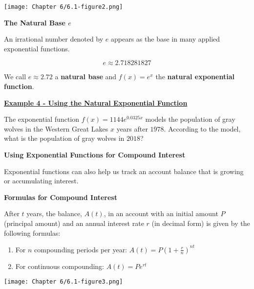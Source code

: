 \documentclass[12pt]{book}
\newcommand{\D}{\displaystyle}
\begin{document}
\newpage

\centerline{\texttt{[image: Chapter 6/6.1-figure2.png]}}

\vspace{30mm}



{\large \textbf{The Natural Base $e$}}

An irrational number denoted by $e$ appears as the base in many applied exponential functions.

$$e \approx 2.718281827$$

We call $e\approx 2.72$ a \textbf{natural base} and $f(x)=e^x$ the \textbf{natural exponential function}.

\vspace{30mm}
\underline{\textbf{Example 4 - Using the Natural Exponential Function}}

The exponential function $f(x)=1144e^{0.0325x}$ models the population of gray wolves in the Western Great Lakes $x$ years after $1978$. According to the model, what is the population of gray wolves in $2018$?
\newpage

{\large \textbf{Using Exponential Functions for Compound Interest}}

Exponential functions can also help us track an account balance that is growing or accumulating interest.

\begin{boxR}
    \textbf{Formulas for Compound Interest}
    \vspace{1mm}
    \hline
    \vspace{2mm}

    After $t$ years, the balance, $A(t)$, in an account with an initial amount $P$ (principal amount) and an annual interest rate $r$ (in decimal form) is given by the following formulas:
\vspace{1mm}

    \begin{enumerate}
        \item For $n$ compounding periods per year: $\D A(t) = P\left(1+ \frac{r}{n}\right)^{nt}$
\vspace{1mm}
        \item For continuous compounding: $\D A(t)=Pe^{rt}$
    \end{enumerate}
\end{boxR}

\centerline{\texttt{[image: Chapter 6/6.1-figure3.png]}}
\vspace{4mm}
\end{document}
